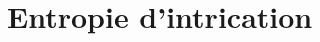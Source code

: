 \documentclass[xcolor=dvipsnames]{beamer}
\newcommand{\ket}[1]{\ensuremath{|#1\rangle}\xspace}
\newcommand{\1}{\ensuremath{\ket{\om_1\bom_1}}\xspace}
\newcommand{\2}{\ensuremath{\ket{\om_2\bom_2}}\xspace}
\newcommand{\spinu}{\ensuremath{\ket{\uparrow}}\xspace}
\newcommand{\spind}{\ensuremath{\ket{\downarrow}}\xspace}
\begin{document}
\section{Entropie d'intrication}
\end{document}
